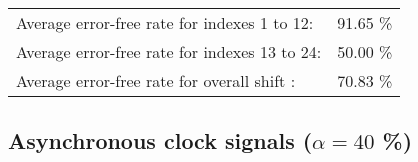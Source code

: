 \begin{table}[h]
\begin{center}
\begin{tabular}{|c|c|c|c|c|}
\end{tabular}


\flushleft
\begin{tabular}{l l}
Average error-free rate for indexes  1 to 12: &  91.65 \% \\
Average error-free rate for indexes 13 to 24: &  50.00 \% \\
Average error-free rate for overall shift   : &  70.83 \% \\

\end{tabular}


\end{center}
\end{table}


\pagebreak
\subsection{Asynchronous clock signals ($\alpha=40$ \%)}

